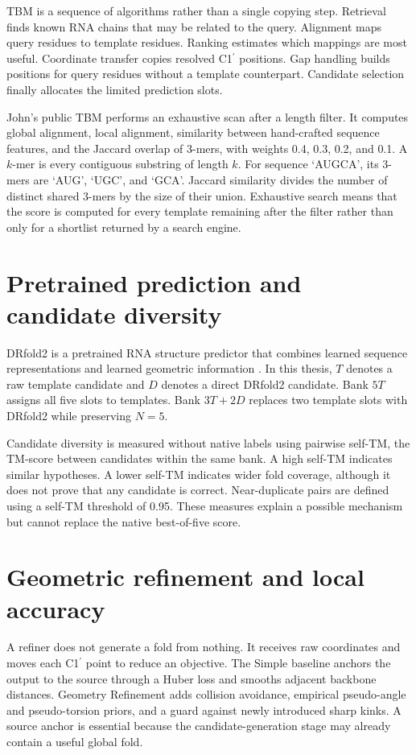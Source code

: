 \documentclass[12pt,a4paper,oneside]{report}
\newcommand{\cprime}{C1$^{\prime}$}
\begin{document}
TBM is a sequence of algorithms rather than a single copying step. Retrieval finds
known RNA chains that may be related to the query. Alignment maps query residues to
template residues. Ranking estimates which mappings are most useful. Coordinate
transfer copies resolved \cprime{} positions. Gap handling builds positions for query
residues without a template counterpart. Candidate selection finally allocates the
limited prediction slots.

John's public TBM performs an exhaustive scan after a length filter. It computes global
alignment, local alignment, similarity between hand-crafted sequence features, and the
Jaccard overlap of 3-mers, with weights 0.4, 0.3, 0.2, and 0.1. A $k$-mer is every
contiguous substring of length $k$. For sequence `AUGCA', its 3-mers are `AUG', `UGC',
and `GCA'. Jaccard similarity divides the number of distinct shared 3-mers by the size
of their union. Exhaustive search means that the score is computed for every template
remaining after the filter rather than only for a shortlist returned by a search
engine.

\section{Pretrained prediction and candidate diversity}

DRfold2 is a pretrained RNA structure predictor that combines learned sequence
representations and learned geometric information \cite{drfold,drfold2}. In this
thesis, $T$ denotes a raw template candidate and $D$ denotes a direct DRfold2 candidate.
Bank $5T$ assigns all five slots to templates. Bank $3T+2D$ replaces two template slots
with DRfold2 while preserving $N=5$.

Candidate diversity is measured without native labels using pairwise self-TM, the
TM-score between candidates within the same bank. A high self-TM indicates similar
hypotheses. A lower self-TM indicates wider fold coverage, although it does not prove
that any candidate is correct. Near-duplicate pairs are defined using a self-TM
threshold of 0.95. These measures explain a possible mechanism but cannot replace the
native best-of-five score.

\section{Geometric refinement and local accuracy}

A refiner does not generate a fold from nothing. It receives raw coordinates and moves
each \cprime{} point to reduce an objective. The Simple baseline anchors the output to
the source through a Huber loss and smooths adjacent backbone distances. Geometry
Refinement adds collision avoidance, empirical pseudo-angle and pseudo-torsion priors,
and a guard against newly introduced sharp kinks. A source anchor is essential because
the candidate-generation stage may already contain a useful global fold.
\end{document}
